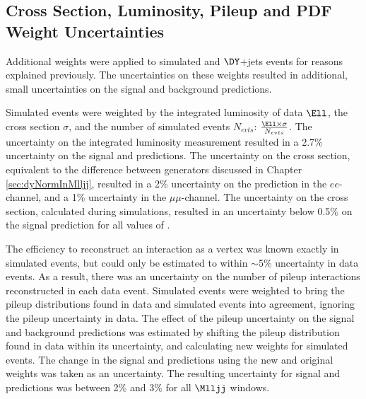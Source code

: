 \subsection{Cross Section, Luminosity, Pileup and PDF Weight Uncertainties}
\label{sec:crossSxnPileupPdfUnc}
Additional weights were applied to simulated \WR and $\DY$+jets events for reasons explained previously.  The uncertainties on 
these weights resulted in additional, small uncertainties on the signal and \DY background predictions.

Simulated events were weighted by the integrated luminosity of data $\Ell$, the cross section $\sigma$, and the number of 
simulated events $N_{evts}$: $\frac{\Ell \times \sigma}{N_{evts}}$.  The uncertainty on the integrated luminosity measurement 
resulted in a 2.7\% uncertainty on the signal and \DY predictions.  The uncertainty on the \DY cross section, equivalent to 
the difference between \DY \MC generators discussed in Chapter \ref{sec:dyNormInMlljj}, resulted in a 2\% uncertainty on the 
\DY prediction in the $ee$-channel, and a 1\% uncertainty in the $\mu\mu$-channel.  The uncertainty on the \WR cross section, 
calculated during simulations, resulted in an uncertainty below 0.5\% on the signal prediction for all values of \mWR.

The efficiency to reconstruct an interaction as a vertex was known exactly in simulated events, but could only be estimated 
to within $\sim$5\% uncertainty in data events.  As a result, there was an uncertainty on the number of pileup interactions 
reconstructed in each data event.  Simulated events were weighted to bring the pileup distributions found in data and simulated 
events into agreement, ignoring the pileup uncertainty in data.  The effect of the pileup uncertainty on the signal and 
background predictions was estimated by shifting the pileup distribution found in data within its uncertainty, and calculating 
new weights for simulated events.  The change in the signal and \DY predictions using the new and original weights was taken 
as an uncertainty.  The resulting uncertainty for signal and \DY predictions was between 2\% and 3\% for all $\Mlljj$ windows.

